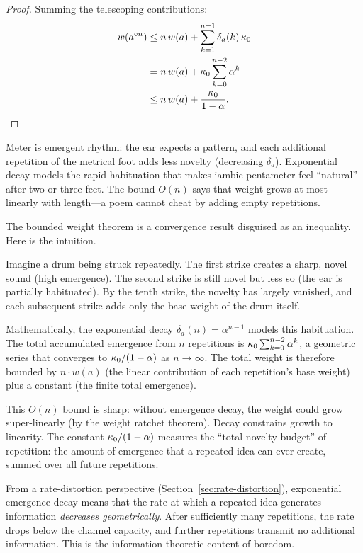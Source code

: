\begin{proof}
Summing the telescoping contributions:
\begin{align*}
  w(a^{\circ n})
  &\le n\,w(a) + \sum_{k=1}^{n-1} \delta_a(k)\,\kappa_0 \\
  &= n\,w(a) + \kappa_0 \sum_{k=0}^{n-2} \alpha^k \\
  &\le n\,w(a) + \frac{\kappa_0}{1-\alpha}. \qedhere
\end{align*}
\end{proof}

\begin{interpretation}
Meter is emergent rhythm: the ear expects a pattern, and
each additional repetition of the metrical foot adds less
novelty (decreasing $\delta_a$).  Exponential decay models
the rapid habituation that makes iambic pentameter feel
``natural'' after two or three feet.  The bound $O(n)$ says
that weight grows at most linearly with length---a poem
cannot cheat by adding empty repetitions.
\end{interpretation}

\begin{remark}
The bounded weight theorem is a convergence result disguised as an
inequality.  Here is the intuition.

Imagine a drum being struck repeatedly.  The first strike creates a
sharp, novel sound (high emergence).  The second strike is still novel
but less so (the ear is partially habituated).  By the tenth strike,
the novelty has largely vanished, and each subsequent strike adds
only the base weight of the drum itself.

Mathematically, the exponential decay $\delta_a(n) = \alpha^{n-1}$
models this habituation.  The total accumulated emergence from $n$
repetitions is $\kappa_0 \sum_{k=0}^{n-2} \alpha^k$, a geometric
series that converges to $\kappa_0 / (1-\alpha)$ as $n \to \infty$.
The total weight is therefore bounded by $n \cdot w(a)$ (the linear
contribution of each repetition's base weight) plus a constant
(the finite total emergence).

This $O(n)$ bound is sharp: without emergence decay, the weight
could grow super-linearly (by the weight ratchet theorem).  Decay
constrains growth to linearity.  The constant $\kappa_0/(1-\alpha)$
measures the ``total novelty budget'' of repetition: the amount of
emergence that a repeated idea can ever create, summed over all
future repetitions.

From a rate-distortion perspective (Section~\ref{sec:rate-distortion}),
exponential emergence decay means that the rate at which a repeated
idea generates information \emph{decreases geometrically}.  After
sufficiently many repetitions, the rate drops below the channel
capacity, and further repetitions transmit no additional information.
This is the information-theoretic content of boredom.
\end{remark}

